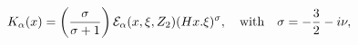 \begin{equation}\label{eq:vector}
K_{\alpha}(x)=\left(\frac{\sigma}{\sigma+1}\right){\cal
E}_{\alpha}(x,\xi,Z_2)(Hx.\xi)^{\sigma},
\quad\mbox{with}\quad\sigma=-\frac{3}{2}- i\nu,
\end{equation}

